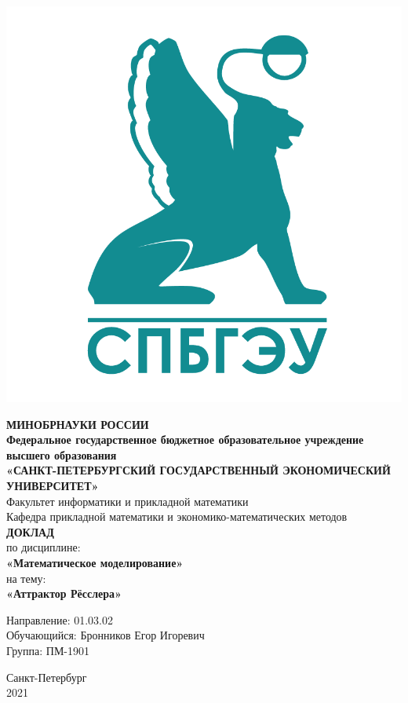 \documentclass[14pt,a4paper,fleqn]{extarticle}
\begin{document}
	\begin{titlepage}
		\includegraphics[scale=0.12]{logo}
		\begin{center}
			\textbf{МИНОБРНАУКИ РОССИИ}\\
			\vspace{0.2cm}
			\textbf{Федеральное государственное бюджетное образовательное учреждение высшего образования}\\
			\textbf{«САНКТ-ПЕТЕРБУРГСКИЙ ГОСУДАРСТВЕННЫЙ ЭКОНОМИЧЕСКИЙ УНИВЕРСИТЕТ»}\\
			\vspace{0.6cm}
			Факультет информатики и прикладной математики\\
			Кафедра прикладной математики и экономико-математических методов\\
			\vspace{1cm}
			\textbf{ДОКЛАД}\\
			по дисциплине:\\
			\textbf{«Математическое моделирование»}\\
			на тему:\\
			\textbf{«Аттрактор Рёсслера»}\\
		\end{center}
		\vspace{1cm}
		Направление: 01.03.02\\
		Обучающийся: Бронников Егор Игоревич\\
		Группа: ПМ-1901\\
		\vfill
		\begin{center}
			Санкт-Петербург\\
			2021\\
		\end{center}
	\end{titlepage}
\end{document}
